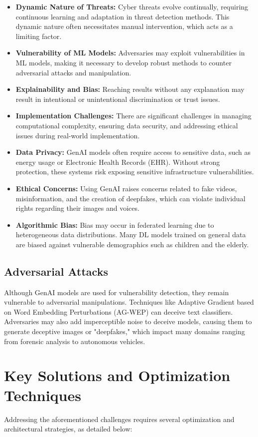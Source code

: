 \documentclass[journal]{IEEEtran}
\begin{document}
\begin{itemize}
    \item \textbf{Dynamic Nature of Threats:} Cyber threats evolve continually, requiring continuous learning and adaptation in threat detection methods. This dynamic nature often necessitates manual intervention, which acts as a limiting factor.
    \item \textbf{Vulnerability of ML Models:} Adversaries may exploit vulnerabilities in ML models, making it necessary to develop robust methods to counter adversarial attacks and manipulation.
    \item \textbf{Explainability and Bias:} Reaching results without any explanation may result in intentional or unintentional discrimination or trust issues.
    \item \textbf{Implementation Challenges:} There are significant challenges in managing computational complexity, ensuring data security, and addressing ethical issues during real-world implementation.
    \item \textbf{Data Privacy:} GenAI models often require access to sensitive data, such as energy usage or Electronic Health Records (EHR). Without strong protection, these systems risk exposing sensitive infrastructure vulnerabilities.
    \item \textbf{Ethical Concerns:} Using GenAI raises concerns related to fake videos, misinformation, and the creation of deepfakes, which can violate individual rights regarding their images and voices.
    \item \textbf{Algorithmic Bias:} Bias may occur in federated learning due to heterogeneous data distributions. Many DL models trained on general data are biased against vulnerable demographics such as children and the elderly.
\end{itemize}

\subsection{Adversarial Attacks}
Although GenAI models are used for vulnerability detection, they remain vulnerable to adversarial manipulations. Techniques like Adaptive Gradient based on Word Embedding Perturbations (AG-WEP) can deceive text classifiers. Adversaries may also add imperceptible noise to deceive models, causing them to generate deceptive images or "deepfakes," which impact many domains ranging from forensic analysis to autonomous vehicles.
\section{Key Solutions and Optimization Techniques}
Addressing the aforementioned challenges requires several optimization and architectural strategies, as detailed below:
\end{document}
